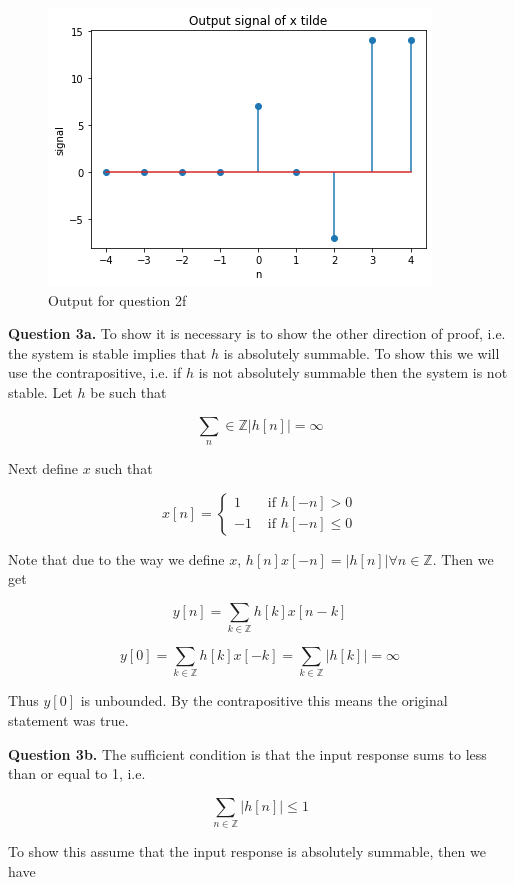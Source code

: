\documentclass[letterpaper, reqno,11pt]{article}
\newcommand{\ZZ}{\mathbb{Z}}
\begin{document}
\begin{figure}[htbp]
\centering
\includegraphics[width=\textwidth]{2f}
\caption{Output for question 2f}
\label{fig:2f}
\end{figure}

{\noindent\bf Question 3a.} To show it is necessary is to show the other direction of proof, i.e. the system is stable implies that $h$ is absolutely summable. To show this we will use the contrapositive, i.e. if $h$ is not absolutely summable then the system is not stable. Let $h$ be such that 

$$
    \sum_n\in\ZZ|h[n]|=\infty
$$

Next define $x$ such that 

$$
    x[n]=\begin{cases}1&\text{ if }h[-n]>0\\-1&\text{ if } h[-n] \leq 0\end{cases}
$$

Note that due to the way we define $x$, $h[n]x[-n]=|h[n]|\forall n\in\ZZ$. Then we get 

$$
    y[n]=\sum_{k\in\ZZ} h[k]x[n-k]
$$

$$
    y[0]=\sum_{k\in\ZZ}h[k]x[-k]=\sum_{k\in\ZZ}|h[k]|=\infty
$$

Thus $y[0]$ is unbounded. By the contrapositive this means the original statement was true. 

{\noindent\bf Question 3b.} The sufficient condition is that the input response sums to less than or equal to 1, i.e.

$$
    \sum_{n\in\ZZ} |h[n]|\leq1
$$

To show this assume that the input response is absolutely summable, then we have 
\end{document}

